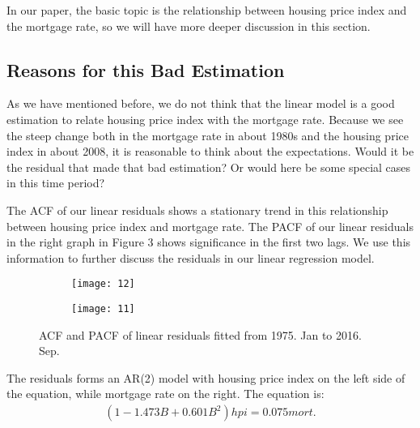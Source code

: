 \documentclass[12pt,letterpaper]{article}
\begin{document}
In our paper, the basic topic is the relationship between housing price index and the mortgage rate, so we will have more deeper discussion in this section.

\subsection{Reasons for this Bad Estimation}
As we have mentioned before, we do not think that the linear model is a good estimation to relate housing price index with the mortgage rate.
Because we see the steep change both in the mortgage rate in about 1980s and the housing price index in about 2008, it is reasonable to think about the expectations.
Would it be the residual that made that bad estimation? 
Or would here be some special cases in this time period?

The ACF of our linear residuals shows a stationary trend in this relationship between housing price index and mortgage rate. 
The PACF of our linear residuals in the right graph in Figure 3 shows significance in the first two lags.
We use this information to further discuss the residuals in our linear regression model.

\begin{figure*}[h!]
\begin{subfigure}[b]{0.4\textwidth}
\begin{center}
 \texttt{[image: 12]}
 \vspace{-0.4cm}
\end{center}
\end{subfigure}
\qquad
\qquad
\begin{subfigure}[b]{0.4\textwidth}
\begin{center}
 \texttt{[image: 11]}
 \vspace{-0.4cm}
\end{center}
\end{subfigure}
 \vspace{-.1cm}
 \caption{ ACF and PACF of linear residuals fitted from 1975. Jan to 2016. Sep.}
      \label{fig:time}
\vspace{-.25cm}
\end{figure*}

The residuals forms an AR(2) model with housing price index on the left side of the equation, while mortgage rate on the right.
The equation is: 
\begin{equation}
\begin{aligned}
(1-1.473B+0.601B^2) hpi = 0.075mort.
\end{aligned}
\end{equation}
\end{document}
